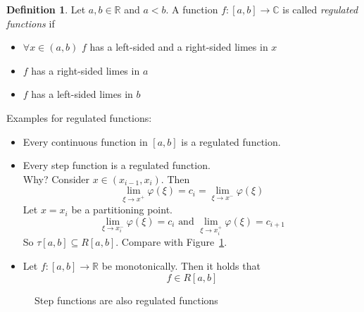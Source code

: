 \documentclass[a4paper,landscape,twocolumn]{article}
\theoremstyle{definition}
\newtheorem{defi}{Definition}
\begin{document}
\begin{defi}
  Let $a,b \in \mathbb R$ and $a < b$. A function $f: [a,b] \to \mathbb C$ is called
  \emph{regulated functions} if
  \begin{itemize}
    \item $\forall x \in (a,b)$ $f$ has a left-sided and a right-sided limes in $x$
    \item $f$ has a right-sided limes in $a$
    \item $f$ has a left-sided limes in $b$
  \end{itemize}
\end{defi}

Examples for regulated functions:
\begin{itemize}
  \item Every continuous function in $[a,b]$ is a regulated function.
  \item Every step function is a regulated function. \\
    Why? Consider $x \in (x_{i-1},x_i)$. Then
    \[ \lim_{\xi\to x^+} \varphi(\xi) = c_i = \lim_{\xi \to x^-} \varphi(\xi) \]
    Let $x = x_i$ be a partitioning point.
    \[ \lim_{\xi \to x_i^-} \varphi(\xi) = c_i \text{ and } \lim_{\xi \to x_i^+} \varphi(\xi) = c_{i+1} \]
    So $\tau[a,b] \subseteq R[a,b]$. Compare with Figure~\ref{img:step-regulated}.
  \item
    Let $f: [a,b] \to \mathbb R$ be monotonically.
    Then it holds that
    \[ f \in R[a,b] \]
\end{itemize}

\begin{figure}[!h]
  \begin{center}
    \caption{Step functions are also regulated functions}
    \label{img:step-regulated}
  \end{center}
\end{figure}
\end{document}
